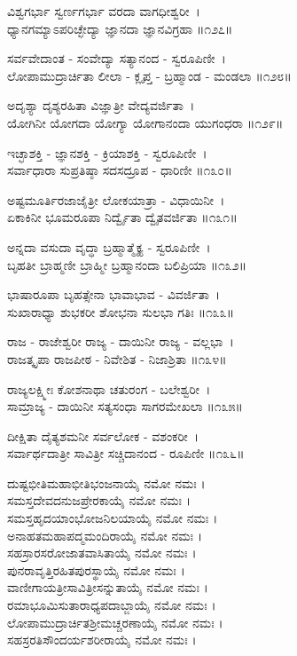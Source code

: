 ವಿಶ್ವಗರ್ಭಾ ಸ್ವರ್ಣಗರ್ಭಾ ವರದಾ ವಾಗಧೀಶ್ವರೀ~।\\
ಧ್ಯಾನಗಮ್ಯಾಽಪರಿಚ್ಛೇದ್ಯಾ ಜ್ಞಾನದಾ ಜ್ಞಾನವಿಗ್ರಹಾ ॥೧೨೭॥

ಸರ್ವವೇದಾಂತ - ಸಂವೇದ್ಯಾ ಸತ್ಯಾನಂದ - ಸ್ವರೂಪಿಣೀ~।\\
ಲೋಪಾಮುದ್ರಾರ್ಚಿತಾ ಲೀಲಾ - ಕ್ಲೃಪ್ತ - ಬ್ರಹ್ಮಾಂಡ - ಮಂಡಲಾ ॥೧೨೮॥

ಅದೃಶ್ಯಾ ದೃಶ್ಯರಹಿತಾ ವಿಜ್ಞಾತ್ರೀ ವೇದ್ಯವರ್ಜಿತಾ~।\\
ಯೋಗಿನೀ ಯೋಗದಾ ಯೋಗ್ಯಾ ಯೋಗಾನಂದಾ ಯುಗಂಧರಾ ॥೧೨೯॥

ಇಚ್ಛಾಶಕ್ತಿ - ಜ್ಞಾನಶಕ್ತಿ - ಕ್ರಿಯಾಶಕ್ತಿ - ಸ್ವರೂಪಿಣೀ~।\\
ಸರ್ವಾಧಾರಾ ಸುಪ್ರತಿಷ್ಠಾ ಸದಸದ್ರೂಪ - ಧಾರಿಣೀ ॥೧೩೦॥

ಅಷ್ಟಮೂರ್ತಿರಜಾಜೈತ್ರೀ ಲೋಕಯಾತ್ರಾ - ವಿಧಾಯಿನೀ~।\\
ಏಕಾಕಿನೀ ಭೂಮರೂಪಾ ನಿರ್ದ್ವೈತಾ ದ್ವೈತವರ್ಜಿತಾ ॥೧೩೧॥

ಅನ್ನದಾ ವಸುದಾ ವೃದ್ಧಾ ಬ್ರಹ್ಮಾತ್ಮೈಕ್ಯ - ಸ್ವರೂಪಿಣೀ~।\\
ಬೃಹತೀ ಬ್ರಾಹ್ಮಣೀ ಬ್ರಾಹ್ಮೀ ಬ್ರಹ್ಮಾನಂದಾ ಬಲಿಪ್ರಿಯಾ ॥೧೩೨॥

ಭಾಷಾರೂಪಾ ಬೃಹತ್ಸೇನಾ ಭಾವಾಭಾವ - ವಿವರ್ಜಿತಾ~।\\
ಸುಖಾರಾಧ್ಯಾ ಶುಭಕರೀ ಶೋಭನಾ ಸುಲಭಾ ಗತಿಃ ॥೧೩೩॥

ರಾಜ - ರಾಜೇಶ್ವರೀ ರಾಜ್ಯ - ದಾಯಿನೀ ರಾಜ್ಯ - ವಲ್ಲಭಾ~।\\
ರಾಜತ್ಕೃಪಾ ರಾಜಪೀಠ - ನಿವೇಶಿತ - ನಿಜಾಶ್ರಿತಾ ॥೧೩೪॥

ರಾಜ್ಯಲಕ್ಷ್ಮೀಃ ಕೋಶನಾಥಾ ಚತುರಂಗ - ಬಲೇಶ್ವರೀ~।\\
ಸಾಮ್ರಾಜ್ಯ - ದಾಯಿನೀ ಸತ್ಯಸಂಧಾ ಸಾಗರಮೇಖಲಾ ॥೧೩೫॥

ದೀಕ್ಷಿತಾ ದೈತ್ಯಶಮನೀ ಸರ್ವಲೋಕ - ವಶಂಕರೀ~।\\
ಸರ್ವಾರ್ಥದಾತ್ರೀ ಸಾವಿತ್ರೀ ಸಚ್ಚಿದಾನಂದ - ರೂಪಿಣೀ  ॥೧೩೬॥

ದುಷ್ಟಭೀತಿಮಹಾಭೀತಿಭಂಜನಾಯೈ ನಮೋ ನಮಃ ।\\
ಸಮಸ್ತದೇವದನುಜಪ್ರೇರಕಾಯೈ ನಮೋ ನಮಃ ।\\
ಸಮಸ್ತಹೃದಯಾಂಭೋಜನಿಲಯಾಯೈ ನಮೋ ನಮಃ ।\\
ಅನಾಹತಮಹಾಪದ್ಮಮಂದಿರಾಯೈ ನಮೋ ನಮಃ ।\\
ಸಹಸ್ರಾರಸರೋಜಾತವಾಸಿತಾಯೈ ನಮೋ ನಮಃ ।\\
ಪುನರಾವೃತ್ತಿರಹಿತಪುರಸ್ಥಾಯೈ ನಮೋ ನಮಃ ।\\
ವಾಣೀಗಾಯತ್ರೀಸಾವಿತ್ರೀಸನ್ನುತಾಯೈ ನಮೋ ನಮಃ ।\\
ರಮಾಭೂಮಿಸುತಾರಾಧ್ಯಪದಾಬ್ಜಾಯೈ ನಮೋ ನಮಃ ।\\
ಲೋಪಾಮುದ್ರಾರ್ಚಿತಶ್ರೀಮಚ್ಚರಣಾಯೈ ನಮೋ ನಮಃ ।\\
ಸಹಸ್ರರತಿಸೌಂದರ್ಯಶರೀರಾಯೈ ನಮೋ ನಮಃ ।

